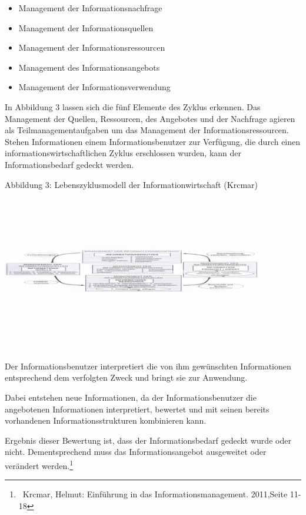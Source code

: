 \documentclass{article}
\begin{document}
\begin{itemize}
\item Management der Informationsnachfrage
\item Management der Informationsquellen
\item Management der Informationsressourcen
\item Management des Informationsangebots
\item Management der Informationsverwendung
\end{itemize}
In Abbildung 3 lassen sich die fünf Elemente des Zyklus erkennen. Das Management der Quellen, Ressourcen, des Angebotes
und der Nachfrage agieren als Teilmanagementaufgaben um das Management der Informationsressourcen.\newline
Stehen Informationen einem Informationsbenutzer zur Verfügung, die durch einen informationswirtschaftlichen Zyklus
erschlossen wurden, kann der Informationsbedarf gedeckt werden.

\begin{center}
\begin{minipage}{12.056cm}
Abbildung 3: Lebenszyklusmodell der Informationwirtschaft (Krcmar) 
\includegraphics[width=11.658cm,height=7.146cm]{ErsterEntwurfderHausarbeitAlina-img/ErsterEntwurfderHausarbeitAlina-img003.pdf}\end{minipage}
\end{center}
Der Informationsbenutzer interpretiert die von ihm gewünschten Informationen entsprechend dem verfolgten Zweck und
bringt sie zur Anwendung.

Dabei entstehen neue Informationen, da der Informationsbenutzer die angebotenen Informationen interpretiert, bewertet
und mit seinen bereits vorhandenen Informationsstrukturen kombinieren kann.

Ergebnis dieser Bewertung ist, dass der Informationsbedarf gedeckt wurde oder nicht. Dementsprechend muss das
Informationsangebot ausgeweitet oder verändert werden.\footnote{\ Krcmar, Helmut: Einführung in das
Informationsmanagement. 2011,Seite 11-18}
\end{document}
